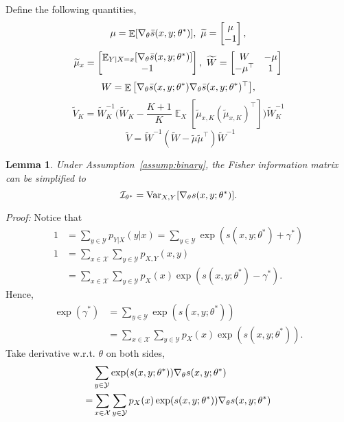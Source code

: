 \documentclass[11pt,a4paper]{article}
\DeclareMathOperator{\E}{\mathbb{E}}
\newcommand{\var}{\operatorname{Var}}
\newcommand{\wt}[1]{\widetilde{#1}}
\newcommand{\gtheta}{\ensuremath \nabla_{\theta}}
\newcommand{\str}[3]{s(#1, #2; #3)}
\newcommand{\ssf}[3]{\bar{s}(#1, #2; #3)}
\newcommand{\vbk}{\wt{V}_{K}}
\newcommand{\vb}{\wt{V}}
\newcommand{\wbk}{\wt{W}_{K}}
\newcommand{\wb}{\wt{W}}
\newcommand{\mub}{\wt{\mu}}
\newcommand{\mubxk}{\wt{\mu}_{x, K}}
\newcommand{\mubx}{\wt{\mu}_{x}}
\newcommand{\fisher}{\mathcal{I}_{\theta^*}}
\newtheorem{lemma}{Lemma}[section]
\begin{document}
Define the following quantities,
\[
\mu = \E[ \gtheta  \ssf{x}{y}{\theta^*} ], ~\wt{\mu} = \begin{bmatrix} \mu \\ -1\end{bmatrix}, 
\]
\[
\mubx = \begin{bmatrix} \E_{Y|X=x}[ \gtheta  \ssf{x}{y}{\theta^*}] \\ -1 \end{bmatrix}, ~\wb = \begin{bmatrix} W & -\mu \\ -\mu^\top & 1 \end{bmatrix}
\]
\[
W = \E \big[\gtheta \ssf{x}{y}{\theta^*} \gtheta \ssf{x}{y}{\theta^*}^\top \big], 
\]
\[
\vbk = \wbk^{-1} \Big(\wbk - \frac{K+1}{K} \E_X \left[\mubxk  (\mubxk)^\top \right] \Big) \wbk^{-1}
\]
\[
~~\vb =  \wb^{-1}\left(\wb -  \mub\mub^\top \right)\wb^{-1}
\]
\begin{lemma}
  Under Assumption~\ref{assump:binary}, the Fisher information matrix can be simplified to 
  \[
    \fisher = \var_{X,Y}[\gtheta \str{x}{y}{\theta^*}].
  \]
  \label{lem:fisher}
\end{lemma}
{\em Proof: }
Notice that 
\begin{equation*}
\begin{aligned}
1 &= \sum_{y\in\mathcal{Y}} p_{Y|X}(y|x) = \sum_{y\in\mathcal{Y}} \exp(\str{x}{y}{\theta^*} + \gamma^*)\\
1 &= \sum_{x\in\mathcal{X}}\sum_{y\in\mathcal{Y}} p_{X, Y}(x, y) \\
& = \sum_{x\in\mathcal{X}} \sum_{y\in\mathcal{Y}} p_X(x) \exp(\str{x}{y}{\theta^*} - \gamma^*). 
\end{aligned}
\end{equation*}
Hence,
\begin{equation*}
\begin{aligned}
\exp(\gamma^*) & = \sum_{y\in\mathcal{Y}} \exp(\str{x}{y}{\theta^*}) \\
& = \sum_{x\in\mathcal{X}} \sum_{y\in\mathcal{Y}} p_X(x) \exp(\str{x}{y}{\theta^*}). 
\end{aligned}
\end{equation*}
Take derivative w.r.t. $\theta$ on both sides,
\begin{equation*}
\begin{aligned}
  & \sum_{y\in\mathcal{Y}} \exp(\str{x}{y}{\theta^*})\gtheta \str{x}{y}{\theta^*} \\
= & \sum_{x\in\mathcal{X}} \sum_{y\in\mathcal{Y}} p_X(x) \exp(\str{x}{y}{\theta^*})\gtheta \str{x}{y}{\theta^*} 
\end{aligned}
\end{equation*}
\end{document}
